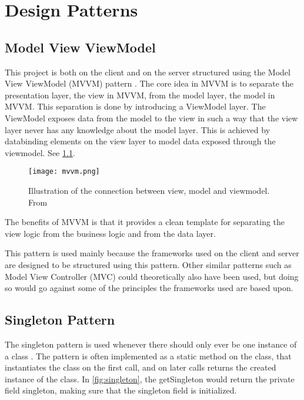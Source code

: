 \chapter{Design Patterns}

\section{Model View ViewModel}

This project is both on the client and on the server structured using
the Model View ViewModel (MVVM) pattern \cite{mvvm}. The core idea in MVVM is to
separate the presentation layer, the view in MVVM, from the model
layer, the model in MVVM. This separation is done by introducing a
ViewModel layer. The ViewModel exposes data from the model to the view
in such a way that the view layer never has any knowledge about the
model layer. This is achieved by databinding elements on the view
layer to model data exposed through the viewmodel. See \cref{fig:mvvm}.

\begin{figure}
  \centering
  \texttt{[image: mvvm.png]}
  \caption{Illustration of the connection between view, model and
    viewmodel. From \cite{mvvm}}\label{fig:mvvm}
\end{figure}

The benefits of MVVM is that it provides a clean template for
separating the view logic from the business logic and from the data
layer.

This pattern is used mainly because the frameworks used on the client
and server are designed to be structured using this pattern. Other
similar patterns such as Model View Controller (MVC) could
theoretically also have been used, but doing so would go against some
of the principles the frameworks used are based upon.

\section{Singleton Pattern}

The singleton pattern is used whenever there should only ever be one
instance of a class \cite{skeet2013c}. The pattern is often implemented as a static
method on the class, that instantiates the class on the first call,
and on later calls returns the created instance of the class. In
\cref{fig:singleton}, the getSingleton would return the private field
singleton, making sure that the singleton field is initialized.

